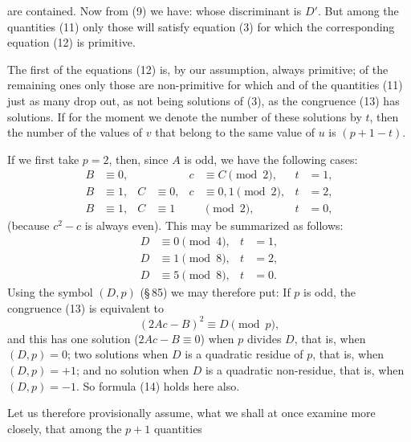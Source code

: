 are contained. Now from (9) we have:
whose discriminant is $D'$. But among the quantities (11) only those will satisfy equation (3) for which the corresponding equation (12) is primitive.

The first of the equations (12) is, by our assumption, always primitive; of the remaining ones only those are non-primitive for which
and of the quantities (11) just as many drop out, as not being solutions of (3), as the congruence (13) has solutions. If for the moment we denote the number of these solutions by $t$, then the number of the values of $v$ that belong to the same value of $u$ is $(p + 1 - t)$.

If we first take $p = 2$, then, since $A$ is odd, we have the following cases:
\[
\begin{aligned}
B &\equiv 0, & & & c &\equiv C \pmod{2}, & t &= 1, \\
B &\equiv 1, & C &\equiv 0, & c &\equiv 0, 1 \pmod{2}, & t &= 2, \\
B &\equiv 1, & C &\equiv 1 & & \pmod{2}, & t &= 0,
\end{aligned}
\]
(because $c^2 - c$ is always even). This may be summarized as follows:
\[
\begin{aligned}
D &\equiv 0 \pmod{4}, & t &= 1, \\
D &\equiv 1 \pmod{8}, & t &= 2, \\
D &\equiv 5 \pmod{8}, & t &= 0.
\end{aligned}
\]
Using the symbol $(D, p)$ (\S\,85) we may therefore put:
If $p$ is odd, the congruence (13) is equivalent to
\[
(2Ac - B)^2 \equiv D \pmod{p},
\]
and this has one solution ($2Ac - B \equiv 0$) when $p$ divides $D$, that is, when $(D, p) = 0$; two solutions when $D$ is a quadratic residue of $p$, that is, when $(D, p) = +1$; and no solution when $D$ is a quadratic non-residue, that is, when $(D, p) = -1$. So formula (14) holds here also.

Let us therefore provisionally assume, what we shall at once examine more closely, that among the $p + 1$ quantities
